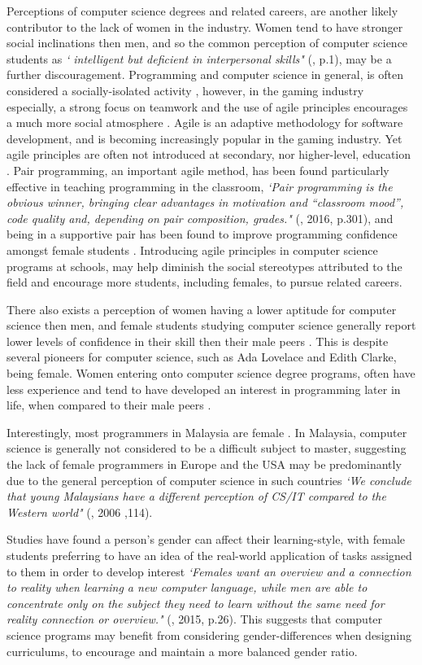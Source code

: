 \documentclass{scrartcl}
\begin{document}
Perceptions of computer science degrees and related careers, are another likely contributor to the lack of women in the industry. Women tend to have stronger social inclinations then men, and so the common perception of computer science students as \textit{` intelligent but deficient in interpersonal skills"} (\cite{7}, p.1), may be a further discouragement. Programming and computer science in general, is often considered a socially-isolated activity \cite{5}, however, in the gaming industry especially, a strong focus on teamwork and the use of agile principles encourages a much more social atmosphere \cite{4}. Agile is an adaptive methodology for software development, and is becoming increasingly popular in the gaming industry. Yet agile principles are often not introduced at secondary, nor higher-level, education \cite{2}. Pair programming, an important agile method, has been found particularly effective in teaching programming in the classroom, \textit{`Pair programming is the obvious winner, bringing clear advantages in motivation and “classroom mood”, code quality and, depending on pair composition, grades."} (\cite{2}, 2016, p.301), and being in a supportive pair has been found to improve programming confidence amongst female students \cite{3}. Introducing agile principles in computer science programs at schools, may help diminish the social stereotypes attributed to the field and encourage more students, including females, to pursue related careers.

There also exists a perception of women having a lower aptitude for computer science then men, and female students studying computer science generally report lower levels of confidence in their skill then their male peers \cite{7}. This is despite several pioneers for computer science, such as Ada Lovelace and Edith Clarke, being female. Women entering onto computer science degree programs, often have less experience and tend to have developed an interest in programming later in life, when compared to their male peers \cite{9}. 

Interestingly, most programmers in Malaysia are female \cite{8}. In Malaysia, computer science is generally not considered to be a difficult subject to master, suggesting the lack of female programmers in Europe and the USA may be predominantly due to the general perception of computer science in such countries \textit{`We conclude that young Malaysians have a different perception of CS/IT compared to the Western world"} (\cite{8}, 2006 ,114).

Studies have found a person's gender can affect their learning-style, with female students preferring to have an idea of the real-world application of tasks assigned to them in order to develop interest \textit{`Females want an overview and a connection to reality when learning a new computer language, while men are able to concentrate only on the subject they need to learn without the same need for reality connection or overview."} (\cite{10}, 2015, p.26). This suggests that computer science programs may benefit from considering gender-differences when designing curriculums, to encourage and maintain a more balanced gender ratio.
\end{document}
